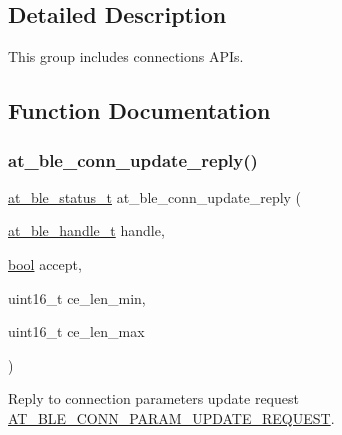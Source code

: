 \subsection{Detailed Description}
This group includes connections A\+P\+Is. 



\subsection{Function Documentation}
\mbox{\label{group__gap__conn__group_gaf569678c3c460affa1d42d406322aa40}} 
\subsubsection{\texorpdfstring{at\_ble\_conn\_update\_reply()}{at\_ble\_conn\_update\_reply()}}
{\footnotesize\ttfamily \mbox{\hyperlink{group__error__codes__group_ga3b1db9b95feb157b3c188ca27fe76988}{at\+\_\+ble\+\_\+status\+\_\+t}} at\+\_\+ble\+\_\+conn\+\_\+update\+\_\+reply (\begin{DoxyParamCaption}\item[{\mbox{\hyperlink{at__ble__api_8h_abd23646d0c662860741f787efc8456f2}{at\+\_\+ble\+\_\+handle\+\_\+t}}}]{handle,  }\item[{\mbox{\hyperlink{group__group__sam0__utils_ga97a80ca1602ebf2303258971a2c938e2}{bool}}}]{accept,  }\item[{uint16\+\_\+t}]{ce\+\_\+len\+\_\+min,  }\item[{uint16\+\_\+t}]{ce\+\_\+len\+\_\+max }\end{DoxyParamCaption})}



Reply to connection parameters update request \mbox{\hyperlink{at__ble__api_8h_a3324640b95f33169515f89738ed5baebabcde15cbd78da60babb61d623b0cf2b5}{A\+T\+\_\+\+B\+L\+E\+\_\+\+C\+O\+N\+N\+\_\+\+P\+A\+R\+A\+M\+\_\+\+U\+P\+D\+A\+T\+E\+\_\+\+R\+E\+Q\+U\+E\+ST}}. 


